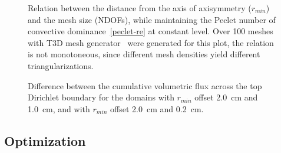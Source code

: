 \documentclass[review,times,3p,10pt]{elsarticle}
\begin{document}
{ \begin{figure}
\centering
{}
 \caption{Relation between the distance from the axis of axisymmetry ($r_{min}$) and the mesh size (NDOFs), while maintaining the Peclet number of convective dominance~\eqref{peclet-re} at constant level. Over 100 meshes with T3D mesh generator~\citep{t3d} were generated for this plot, the relation is not monotoneous, since different mesh densities yield different triangularizations.}
 \label{mesh-dens}
\end{figure}


 \begin{figure}
\centering
{}
 \caption{Difference between the cumulative volumetric flux across  the top Dirichlet boundary for the domains with $r_{min}$ offset 2.0~cm and 1.0~cm, and with $r_{min}$ offset 2.0~cm and 0.2~cm.}
 \label{mesh-evals2}
\end{figure}



\subsection{Optimization}

}
\end{document}
